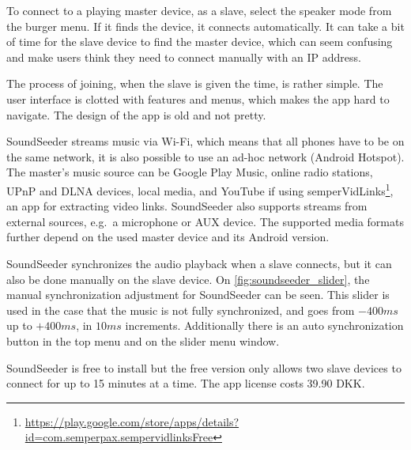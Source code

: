 To connect to a playing master device, as a slave, select the speaker mode from the burger menu.
If it finds the device, it connects automatically.
It can take a bit of time for the slave device to find the master device, which can seem confusing and make users think they need to connect manually with an IP address.

The process of joining, when the slave is given the time, is rather simple.
The user interface is clotted with features and menus, which makes the app hard to navigate.
The design of the app is old and not pretty.

SoundSeeder streams music via Wi-Fi,
which means that all phones have to be on the same network\cite{soundseether_faq}, it is also possible to use an ad-hoc network (Android Hotspot).
The master's music source can be Google Play Music, online radio stations, UPnP and DLNA devices, local media, and YouTube if using semperVidLinks\footnote{\url{https://play.google.com/store/apps/details?id=com.semperpax.sempervidlinksFree}}, an app for extracting video links.
SoundSeeder also supports streams from external sources, e.g.\ a microphone or AUX device.
The supported media formats further depend on the used master device and its Android version.\cite{soundseether_faq}

SoundSeeder synchronizes the audio playback when a slave connects, but it can also be done manually on the slave device.
On \cref{fig:soundseeder_slider}, the manual synchronization adjustment for SoundSeeder can be seen.
This slider is used in the case that the music is not fully synchronized, and goes from $-400 ms$ up to $+400 ms$, in $10 ms$ increments.
Additionally there is an auto synchronization button in the top menu and on the slider menu window.

SoundSeeder is free to install but the free version only allows two slave devices to connect for up to 15 minutes at a time.
The app license costs 39.90 DKK\@.

